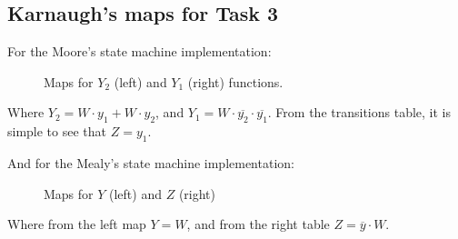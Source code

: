 



\subsection*{Karnaugh's maps for Task 3}
For the Moore's state machine implementation:


\begin{figure}[H]
    \begin{center}
         \begin{Karnaughvuit}
         \end{Karnaughvuit}
         \begin{Karnaughvuit}
         \end{Karnaughvuit}
         \caption{Maps for $Y_2$ (left) and $Y_1$ (right) functions.}
    \end{center}
    \end{figure}
Where $Y_2 = W \cdot y_1 + W \cdot y_2$, and $Y_1 = W \cdot \overline{y_2} \cdot \overline{y_1}$. 
From the transitions table, it is simple to see that $Z = y_1$.

And for the Mealy's state machine implementation:

\begin{figure}[H]
    \begin{center}
     \begin{Karnaughquatre}
     \end{Karnaughquatre}
     \begin{Karnaughquatre}
    \end{Karnaughquatre}
     \caption{Maps for $Y$ (left) and $Z$ (right)}
    \end{center}
\end{figure}
Where from the left map $Y = W$, and from the right
table $Z = \overline{y} \cdot W$.

